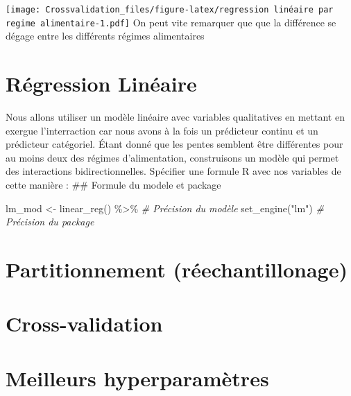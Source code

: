 \documentclass[
]{book}
\newenvironment{Shaded}{\begin{snugshade}}{\end{snugshade}}
\newcommand{\CommentTok}[1]{\textcolor[rgb]{0.56,0.35,0.01}{\textit{#1}}}
\newcommand{\FunctionTok}[1]{\textcolor[rgb]{0.00,0.00,0.00}{#1}}
\newcommand{\NormalTok}[1]{#1}
\newcommand{\OtherTok}[1]{\textcolor[rgb]{0.56,0.35,0.01}{#1}}
\newcommand{\SpecialCharTok}[1]{\textcolor[rgb]{0.00,0.00,0.00}{#1}}
\newcommand{\StringTok}[1]{\textcolor[rgb]{0.31,0.60,0.02}{#1}}
\begin{document}
\texttt{[image: Crossvalidation\_files/figure-latex/regression linéaire par regime alimentaire-1.pdf]}
On peut vite remarquer que que la différence se dégage entre les différents régimes alimentaires

\hypertarget{ruxe9gression-linuxe9aire}{%
\chapter{Régression Linéaire}\label{ruxe9gression-linuxe9aire}}

Nous allons utiliser un modèle linéaire avec variables qualitatives en mettant en exergue l'interraction car nous avons à la fois un prédicteur continu et un prédicteur catégoriel. Étant donné que les pentes semblent être différentes pour au moins deux des régimes d'alimentation, construisons un modèle qui permet des interactions bidirectionnelles. Spécifier une formule R avec nos variables de cette manière :
\#\# Formule du modele et package

\begin{Shaded}
\begin{Highlighting}[]
\NormalTok{lm\_mod }\OtherTok{\textless{}{-}} 
  \FunctionTok{linear\_reg}\NormalTok{() }\SpecialCharTok{\%\textgreater{}\%} \CommentTok{\# Précision du modèle}
  \FunctionTok{set\_engine}\NormalTok{(}\StringTok{"lm"}\NormalTok{) }\CommentTok{\# Précision du package}
\end{Highlighting}
\end{Shaded}

\hypertarget{partitionnement-ruxe9echantillonage}{%
\chapter{Partitionnement (réechantillonage)}\label{partitionnement-ruxe9echantillonage}}

\hypertarget{cross-validation}{%
\chapter{Cross-validation}\label{cross-validation}}

\hypertarget{meilleurs-hyperparamuxe8tres}{%
\chapter{Meilleurs hyperparamètres}\label{meilleurs-hyperparamuxe8tres}}

  
\end{document}
